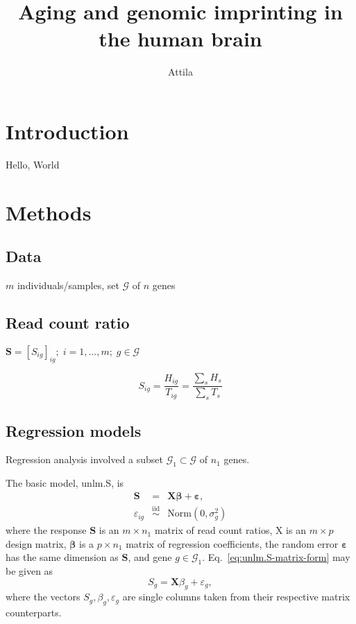 \documentclass[letterpaper]{article}
\title{Aging and genomic imprinting in the human brain}
\author{Attila}
\begin{document}
\maketitle

\section{Introduction}

Hello, World

\section{Methods}

\subsection{Data}

\(m\) individuals/samples, set \(\mathcal{G}\) of \(n\) genes

\subsection{Read count ratio}

\(\mathbf{S} = [S_{ig}]_{ig};\; i=1,...,m; \; g\in\mathcal{G}\)

\begin{equation}
S_{ig} = \frac{H_{ig}}{T_{ig}}= \frac{\sum_s H_s}{\sum_sT_s}
\end{equation}

\subsection{Regression models}

Regression analysis involved a subset \(\mathcal{G}_1\subset\mathcal{G}\) of
\(n_1\) genes.

The basic model, unlm.S, is
\begin{eqnarray}
\mathbf{S} &=& \mathbf{X} \boldsymbol{\beta} + \boldsymbol{\varepsilon},
\label{eq:unlm.S-matrix-form} \\
\varepsilon_{ig} &\overset{\mathrm{iid}}{\sim}& \mathrm{Norm}(0, \sigma^2_g)
\end{eqnarray}
where the response \(\mathbf{S}\) is an \(m\times n_1\) matrix of read count ratios,
\(\mathrm{X}\) is an \(m\times p\) design matrix, \(\boldsymbol{\beta}\) is a \(p\times n_1\) matrix of regression
coefficients, the random error \(\boldsymbol{\varepsilon}\) has the same
dimension as \(\mathbf{S}\), and gene \(g\in \mathcal{G}_1\).  Eq.~\ref{eq:unlm.S-matrix-form} may be given as
\begin{equation}
S_g = \mathbf{X} \beta_g + \varepsilon_g,
\label{eq:unlm.S-vector-form}
\end{equation}
where the vectors \(S_g, \beta_g, \varepsilon_g\)
are single columns taken from their respective matrix counterparts.
\end{document}
